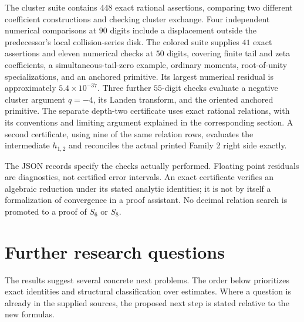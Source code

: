 The cluster suite contains $448$ exact rational assertions,
comparing two different coefficient constructions and checking
cluster exchange. Four independent numerical comparisons at
$90$ digits include a displacement outside the predecessor's
local collision-series disk. The colored suite supplies $41$ exact assertions and eleven
numerical checks at $50$ digits, covering finite tail and zeta
coefficients, a simultaneous-tail-zero example, ordinary moments,
root-of-unity specializations, and an anchored primitive. Its
largest numerical residual is approximately $5.4\times10^{-37}$.
Three further $55$-digit checks evaluate a negative cluster argument
$q=-4$, its Landen transform, and the oriented anchored primitive.
The separate depth-two certificate uses exact rational
relations, with its conventions and limiting argument explained
in the corresponding section. A second certificate, using nine
of the same relation rows, evaluates the intermediate $h_{1,2}$
and reconciles the actual printed Family 2 right side exactly.

The JSON records specify the checks actually performed. Floating
point residuals are diagnostics, not certified error intervals.
An exact certificate verifies an algebraic reduction under its
stated analytic identities; it is not by itself a formalization
of convergence in a proof assistant. No decimal relation search
is promoted to a proof of $S_6$ or $S_8$.

\section{Further research questions}
\label{sec:research}

The results suggest several concrete next problems. The order below
prioritizes exact identities and structural classification over
estimates. Where a question is already in the supplied sources,
the proposed next step is stated relative to the new formulas.

